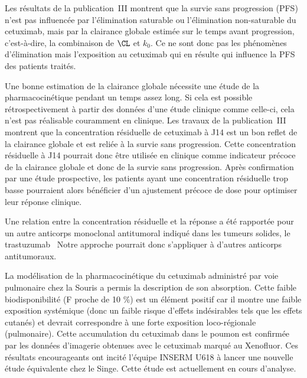 Les résultats de la publication~III montrent que la survie sans progression (PFS) n'est pas influencée par l'élimination saturable ou l'élimination non-saturable du cetuximab, mais par la clairance globale estimée sur le temps avant progression, c'est-à-dire, la combinaison de $\CL$ et $k_0$. Ce ne sont donc pas les phénomènes d'élimination mais l'exposition au cetuximab qui en résulte qui influence la PFS des patients traités.

Une bonne estimation de la clairance globale nécessite une étude de la pharmacocinétique pendant un temps assez long. Si cela est possible rétrospectivement à partir des données d'une étude clinique comme celle-ci, cela n'est pas réalisable couramment en clinique. Les travaux de la publication~III montrent que la concentration résiduelle de cetuximab à J14 est un bon reflet de la clairance globale et est reliée à la survie sans progression. Cette concentration résiduelle à J14 pourrait donc être utilisée en clinique comme indicateur précoce de la clairance globale et donc de la survie sans progression. Après confirmation par une étude prospective, les patients ayant une concentration résiduelle trop basse pourraient alors bénéficier d'un ajustement précoce de dose pour optimiser leur réponse clinique.

Une relation entre la concentration résiduelle et la réponse a été rapportée pour un autre anticorps monoclonal antitumoral indiqué dans les tumeurs solides, le trastuzumab~\citep{REF145} Notre approche pourrait donc s'appliquer à d'autres anticorps antitumoraux.

La modélisation de la pharmacocinétique du cetuximab administré par voie pulmonaire chez la Souris a permis la description de son absorption. Cette faible biodisponibilité (F proche de 10 $\%$) est un élément positif car il montre une faible exposition systémique (donc un faible risque d'effets indésirables tels que les effets cutanés) et devrait correspondre à une forte exposition loco-régionale (pulmonaire). Cette accumulation du cetuximab dans le poumon est confirmée par les données d'imagerie obtenues avec le cetuximab marqué au Xenofluor. Ces résultats encourageants ont incité l'équipe INSERM U618 à lancer une nouvelle étude équivalente chez le Singe. Cette étude est actuellement en cours d'analyse.

